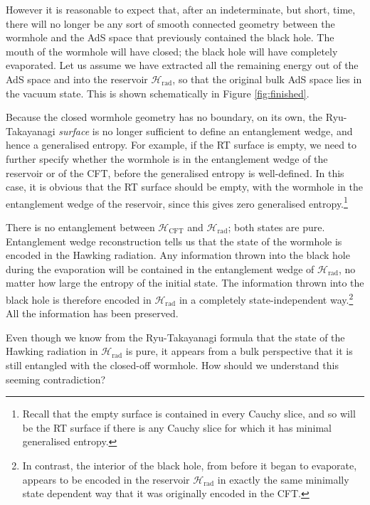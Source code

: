 \documentclass[12pt]{article}
\begin{document}
However it is reasonable to expect that, after an indeterminate, but short, time, there will no longer be any sort of smooth connected geometry between the wormhole and the AdS space that previously contained the black hole. The mouth of the wormhole will have closed; the black hole will have completely evaporated. Let us assume we have extracted all the remaining energy out of the AdS space and into the reservoir $\mathcal{H}_\text{rad}$, so that the original bulk AdS space lies in the vacuum state. This is shown schematically in Figure \ref{fig:finished}.

Because the closed wormhole geometry has no boundary, on its own, the Ryu-Takayanagi \emph{surface} is no longer sufficient to define an entanglement wedge, and hence a generalised entropy. For example, if the RT surface is empty, we need to further specify whether the wormhole is in the entanglement wedge of the reservoir or of the CFT, before the generalised entropy is well-defined. In this case, it is obvious that the RT surface should be empty, with the wormhole in the entanglement wedge of the reservoir, since this gives zero generalised entropy.\footnote{Recall that the empty surface is contained in every Cauchy slice, and so will be the RT surface if there is any Cauchy slice for which it has minimal generalised entropy.}

There is no entanglement between $\mathcal{H}_\text{CFT}$ and $\mathcal{H}_\text{rad}$; both states are pure. Entanglement wedge reconstruction tells us that the state of the wormhole is encoded in the Hawking radiation. Any information thrown into the black hole during the evaporation will be contained in the entanglement wedge of $\mathcal{H}_\text{rad}$, no matter how large the entropy of the initial state. The information thrown into the black hole is therefore encoded in $\mathcal{H}_\text{rad}$ in a completely state-independent way.\footnote{In contrast, the interior of the black hole, from before it began to evaporate, appears to be encoded in the reservoir $\mathcal{H}_\text{rad}$ in exactly the same minimally state dependent way that it was originally encoded in the CFT.} All the information has been preserved.

Even though we know from the Ryu-Takayanagi formula that the state of the Hawking radiation in $\mathcal{H}_\text{rad}$ is pure, it appears from a bulk perspective that it is still entangled with the closed-off wormhole. How should we understand this seeming contradiction? 
\end{document}
